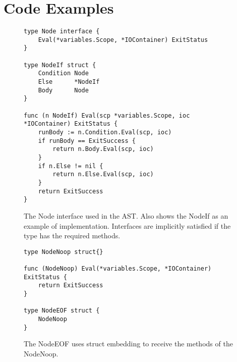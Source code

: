\chapter{Code Examples}

\begin{figure}[h]
\begin{lstlisting}[frame=tb]
type Node interface {
	Eval(*variables.Scope, *IOContainer) ExitStatus
}

type NodeIf struct {
	Condition Node
	Else      *NodeIf
	Body      Node
}

func (n NodeIf) Eval(scp *variables.Scope, ioc *IOContainer) ExitStatus {
	runBody := n.Condition.Eval(scp, ioc)
	if runBody == ExitSuccess {
		return n.Body.Eval(scp, ioc)
	}
	if n.Else != nil {
		return n.Else.Eval(scp, ioc)
	}
	return ExitSuccess
}     
\end{lstlisting}
\caption[The Node Interface]{The Node interface used in the AST. Also shows the NodeIf as an example of implementation. Interfaces are implicitly satisfied if the type has the required methods. \label{lst:node-interface}}
\end{figure}

\begin{figure}[h]
\begin{lstlisting}[frame=tb]
type NodeNoop struct{}

func (NodeNoop) Eval(*variables.Scope, *IOContainer) ExitStatus {
	return ExitSuccess 
}

type NodeEOF struct {
	NodeNoop
}
\end{lstlisting}
\caption[The EOF and No Op node]{The NodeEOF uses struct embedding to receive the methods of the NodeNoop.\label{lst:node-noop}}
\end{figure}

